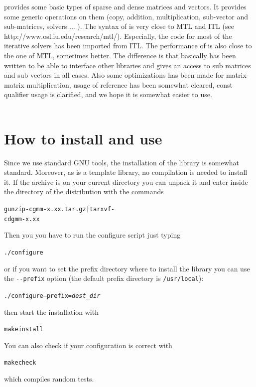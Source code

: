 \documentclass[11pt,a4paper]{article}
\begin{document}
\gmm provides some basic types of sparse and dense matrices and vectors. It provides some generic operations on them (copy, addition, multiplication, sub-vector and sub-matrices, solvers ... ). The syntax of \gmm is very close to MTL and ITL (see http://www.osl.iu.edu/research/mtl/). Especially, the code for most of the iterative solvers has been imported from ITL. The performance of \gmm is also close to the one of MTL, sometimes better. The difference is that basically \gmm has been written to be able to interface other libraries and gives an access to sub matrices and sub vectors in all cases. Also some optimizations has been made for matrix-matrix multiplication, usage of reference has been somewhat cleared, const qualifier usage is clarified, and we hope it is somewhat easier to use.\\ \\[2.5cm]
\htmlonly{\\\\\\}


\newpage
\tableofcontents
\newpage

\section{How to install and use \gmm}
Since we use standard GNU tools, the installation of the \gmm library is somewhat standard. Moreover, as \gmm is a template library, no compilation is needed to install it. If the \gmm  archive is on your current directory you can unpack it and enter inside the directory of the distribution  with the commands
\begin{alltt}
  gunzip -c gmm-x.xx.tar.gz | tar xvf -
  cd  gmm-x.xx
\end{alltt}
Then you you have to run the configure script just typing
\begin{alltt}
  ./configure
\end{alltt}
or if you want to set the prefix directory where to install the library you can use the {\tt {-}{-}prefix} option (the default prefix directory is {\tt /usr/local}):
\begin{alltt}
  ./configure --prefix=\textit{dest_dir}
\end{alltt}
then start the installation with
\begin{alltt}
  make install
\end{alltt}
You can also check if your configuration is correct with
\begin{alltt}
  make check
\end{alltt}
which compiles random tests.
\end{document}

